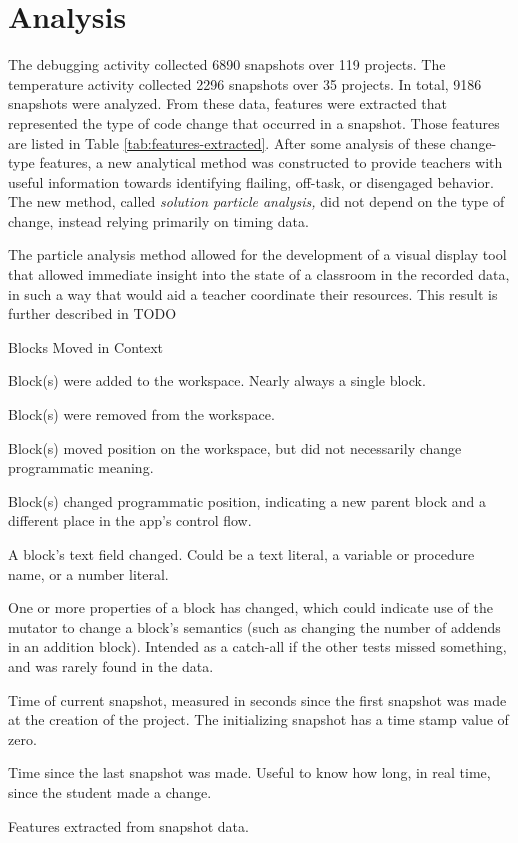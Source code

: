 \chapter{Analysis}
\label{chap:analysis}

The debugging activity collected 6890 snapshots over 119 projects. The temperature activity collected 2296 snapshots over 35 projects. In total, 9186 snapshots were analyzed. From these data, features were extracted that represented the type of code change that occurred in a snapshot. Those features are listed in Table \ref{tab:features-extracted}. After some analysis of these change-type features, a new analytical method was constructed to provide teachers with useful information towards identifying flailing, off-task, or disengaged behavior. The new method, called \emph{solution particle analysis,} did not depend on the type of change, instead relying primarily on timing data. 

The particle analysis method allowed for the development of a visual display tool that allowed immediate insight into the state of a classroom in the recorded data, in such a way that would aid a teacher coordinate their resources. This result is further described in TODO%

\begin{table}
\begin{labeling}{Blocks Moved in Context}

	\item [Blocks Added] Block(s) were added to the workspace. Nearly always a single block.
	\item [Blocks Deleted] Block(s) were removed from the workspace.
	\item [Blocks Moved in Space] Block(s) moved position on the workspace, but did not necessarily change programmatic meaning.
	\item [Blocks Moved in Context] Block(s) changed programmatic position, indicating a new parent block and a different place in the app's control flow.
	\item [Fields Changed] A block's text field changed. Could be a text literal, a variable or procedure name, or a number literal.
	\item [Properties Modified] One or more properties of a block has changed, which could indicate use of the mutator to change a block's semantics (such as changing the number of addends in an addition block). Intended as a catch-all if the other tests missed something, and was rarely found in the data.
	\item [Time Stamp] Time of current snapshot, measured in seconds since the first snapshot was made at the creation of the project. The initializing snapshot has a time stamp value of zero.
	\item [Interval] Time since the last snapshot was made. Useful to know how long, in real time, since the student made a change.

\end{labeling}
\caption[Features extracted from snapshots]{Features extracted from snapshot data.}
\label{tab:features-extracted}
\end{table}

